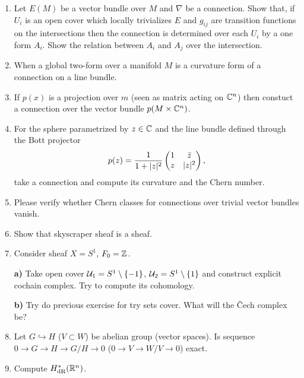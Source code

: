 \documentclass[a4paper,11pt]{article}
\begin{document}
\begin{enumerate}
\item Let $E( M )$ be a vector bundle over $M$ and $\nabla$ be a
  connection. Show that, if $U_{ i }$ is an open cover which locally
  trivializes $E$ and $g_{ i j }$ are transition functions on the
  intersections then the connection is determined over each $U_{ i }$
  by a one form $A_{ i }$. Show the relation between $A_{ i }$ and
  $A_{ j }$ over the intersection.

\item When a global two-form over a manifold $M$ is a curvature form
  of a connection on a line bundle.

\item If $p( x )$ is a projection over $m$ (seen as matrix acting on
  $\mathbb{C}^{ n }$) then constuct a connection over the vector bundle
  $p( M \times \mathbb{C}^{ n } )$.

\item For the sphere parametrized by $z \in \mathbb{C}$ and the line bundle
  defined through the Bott projector
  \begin{equation}
    \label{eq:DiffGeo-10}
    p( z ) =
    \frac{ 1 }{ 1 + \lvert{  z  }\rvert^{ 2 } }
    \begin{pmatrix}
      1 & \bar{z} \\
      z & \lvert{  z  }\rvert^{ 2 }
    \end{pmatrix},
  \end{equation}
  take a connection and compute its curvature and the Chern number.

\item Please verify whether Chern classes for connections over trivial
  vector bundles vanish.

\item Show that skyscraper sheaf is a sheaf.

\item Consider sheaf $X = S^{ 1 }$, $F_{ 0 } = \mathbb{Z}$.

  \textbf{a)} Take open cover
  $\mathcal{U}_{ 1 } = S^{ 1 } \setminus \{ -1 \}$,
  $\mathcal{U}_{ 2 } = S^{ 1 } \setminus \{ 1 \}$ and construct explicit
  cochain complex. Try to compute its cohomology.

  \textbf{b)} Try do previous exercise for try sets cover. What will
  the \v{C}ech complex be?

\item Let $G \hookrightarrow H$ ($V \subset W$) be abelian group (vector spaces). Is
  sequence $0 \to G \to H \to G / H \to 0$ ($0 \to V \to W / V \to 0$) exact.

\item Compute $H_{ \textrm{dR} }^{ * }( \mathbb{R}^{ n } )$.


\end{enumerate}
\end{document}
